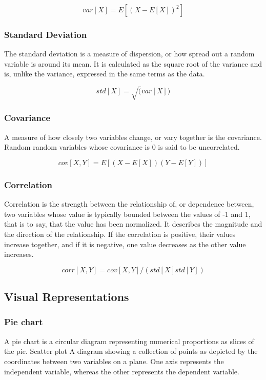 \documentclass[12pt,]{article}
\begin{document}
\[ var[X] = E[(X - E[X])^2] \]

\subsubsection{Standard Deviation}\label{standard-deviation}

The standard deviation is a measure of dispersion, or how spread out a
random variable is around its mean. It is calculated as the square root
of the variance and is, unlike the variance, expressed in the same terms
as the data.

\[ std[X] = \sqrt(var[X]) \]

\subsubsection{Covariance}\label{covariance}

A measure of how closely two variables change, or vary together is the
covariance. Random random variables whose covariance is 0 is said to be
uncorrelated.

\[ cov[X,Y] = E[(X - E[X])(Y-E[Y])] \]

\subsubsection{Correlation}\label{correlation}

Correlation is the strength between the relationship of, or dependence
between, two variables whose value is typically bounded between the
values of -1 and 1, that is to say, that the value has been normalized.
It describes the magnitude and the direction of the relationship. If the
correlation is positive, their values increase together, and if it is
negative, one value decreases as the other value increases.

\[ corr[X,Y] = cov[X,Y] / (std[X]std[Y]) \]

\subsection{Visual Representations}\label{visual-representations}

\subsubsection{Pie chart}\label{pie-chart}

A pie chart is a circular diagram representing numerical proportions as
slices of the pie. Scatter plot A diagram showing a collection of points
as depicted by the coordinates between two variables on a plane. One
axis represents the independent variable, whereas the other represents
the dependent variable.
\end{document}

